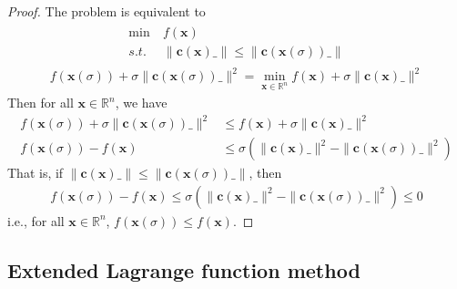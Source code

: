 \begin{proof}
    The problem is equivalent to
    \begin{align}
        \begin{array}{ll}
            \min \ &f(\mathbf{x}) \\
            s.t. \ &\parallel \mathbf{c}
            (\mathbf{x})\_ \parallel \leq
            \parallel \mathbf{c}
            (\mathbf{x}(\sigma))\_ \parallel
        \end{array}
    \end{align}
    \begin{align}
        f(\mathbf{x}(\sigma)) + \sigma \parallel \mathbf{c}
        (\mathbf{x}(\sigma))\_ \parallel^2 = 
        \min_{\mathbf{x} \in \mathbb{R}^n}
        f(\mathbf{x}) + \sigma \parallel \mathbf{c}
        (\mathbf{x})\_ \parallel^2
    \end{align}
    Then for all $\mathbf{x} \in \mathbb{R}^n$, we have
    \begin{align}
        f(\mathbf{x}(\sigma)) + \sigma \parallel \mathbf{c}
        (\mathbf{x}(\sigma))\_ \parallel^2 &\leq 
        f(\mathbf{x}) + \sigma \parallel \mathbf{c}
        (\mathbf{x})\_ \parallel^2 \\
        f(\mathbf{x}(\sigma)) - f(\mathbf{x}) &\leq
        \sigma(\parallel \mathbf{c}
        (\mathbf{x})\_ \parallel^2 - \parallel \mathbf{c}
        (\mathbf{x}(\sigma))\_ \parallel^2)
    \end{align}
    That is, if $\parallel \mathbf{c}
    (\mathbf{x})\_ \parallel \leq \parallel \mathbf{c}
    (\mathbf{x}(\sigma))\_ \parallel$, then
    \begin{align}
        f(\mathbf{x}(\sigma)) - f(\mathbf{x}) \leq
        \sigma(\parallel \mathbf{c}
        (\mathbf{x})\_ \parallel^2 - \parallel \mathbf{c}
        (\mathbf{x}(\sigma))\_ \parallel^2) \leq 0
    \end{align}
    i.e., for all $\mathbf{x} \in \mathbb{R}^n$,
    $f(\mathbf{x}(\sigma)) \leq f(\mathbf{x})$.
    
\end{proof}
\subsection{Extended Lagrange function method}
